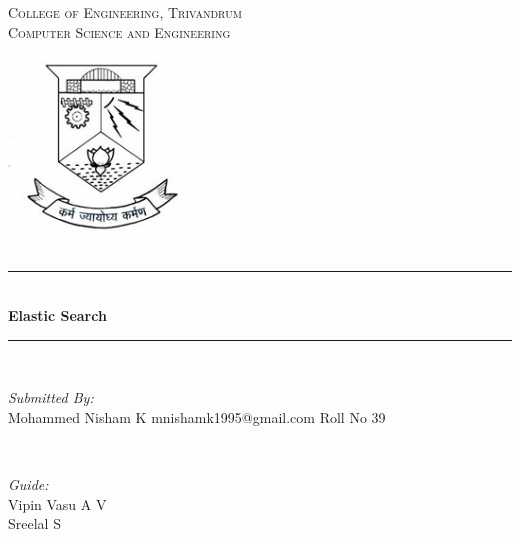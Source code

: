 \documentclass[12pt]{article}
\begin{document}
	\begin{titlepage}
		\newcommand{\HRule}{\rule{\linewidth}{0.5mm}} %
		\center %
		 

		\textsc{\LARGE College of Engineering, Trivandrum}\\[1.5cm] %
		\textsc{\Large Computer Science and Engineering}\\[0.5cm] %
		\includegraphics[width=5cm]{images/cet_emblem.jpg} 

		\HRule \\[0.4cm]
		{ \huge \bfseries Elastic Search}\\[0.4cm] %
		\HRule \\[1.5cm]

		\begin{minipage}{0.4\textwidth}
		\begin{flushleft} \large
		\emph{Submitted By:}\\
		Mohammed Nisham K %
		mnishamk1995@gmail.com
		Roll No 39
		\end{flushleft}
		\end{minipage}
		~
		\begin{minipage}{0.4\textwidth}
		\begin{flushright} \large
		\emph{Guide:} \\
		Vipin Vasu A V \\
		Sreelal S
		\end{flushright}
		\end{minipage}\\[2cm]

		{\large {}}\\[1cm] %

		\vfill %
	\end{titlepage}
\end{document}
